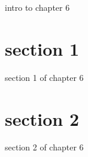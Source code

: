 intro to chapter 6
\section{section 1}
section 1 of chapter 6
\section{section 2}
section 2 of chapter 6